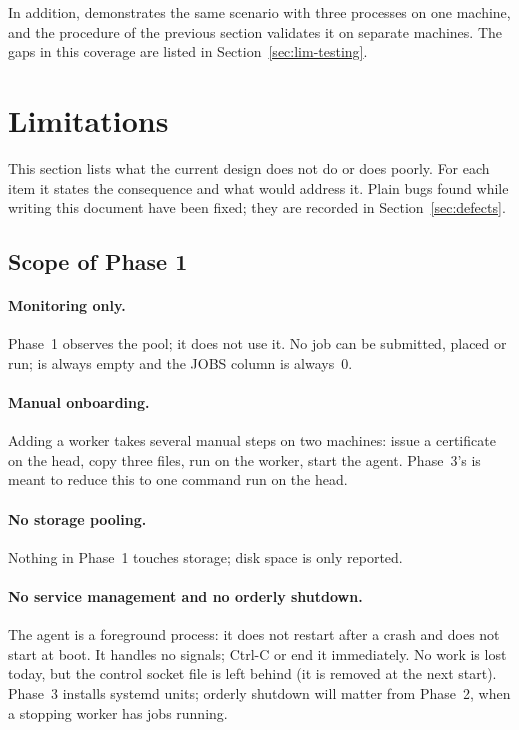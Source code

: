 \documentclass{article}
\begin{document}
In addition,  demonstrates the same scenario
with three processes on one machine, and the procedure of the previous
section validates it on separate machines. The gaps in this coverage are
listed in Section~\ref{sec:lim-testing}.

\section{Limitations}
\label{sec:limitations}

This section lists what the current design does not do or does poorly.
For each item it states the consequence and what would address it.
Plain bugs found while writing this document have been fixed; they are
recorded in Section~\ref{sec:defects}.

\subsection{Scope of Phase 1}

\paragraph{Monitoring only.}
Phase~1 observes the pool; it does not use it. No job can be submitted,
placed or run;  is always empty and the JOBS column is
always~0.

\paragraph{Manual onboarding.}
Adding a worker takes several manual steps on two machines: issue a
certificate on the head, copy three files, run  on the worker,
start the agent. Phase~3's  is meant to reduce this
to one command run on the head.

\paragraph{No storage pooling.}
Nothing in Phase~1 touches storage; disk space is only reported.

\paragraph{No service management and no orderly shutdown.}
The agent is a foreground process: it does not restart after a crash and
does not start at boot. It handles no signals; Ctrl-C or 
end it immediately. No work is lost today, but the control socket file is
left behind (it is removed at the next start). Phase~3 installs systemd
units; orderly shutdown will matter from Phase~2, when a stopping worker
has jobs running.
\end{document}
